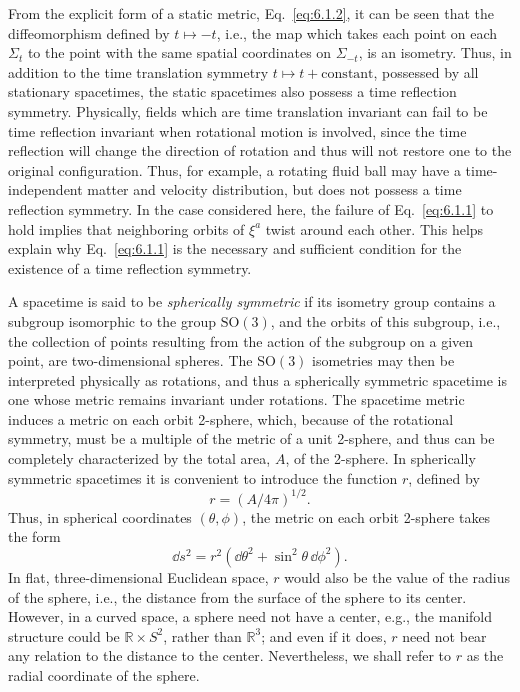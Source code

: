 From the explicit form of a static metric, Eq.~\eqref{eq:6.1.2}, it can be seen
that the diffeomorphism defined by \(t\mapsto-t\), i.e., the map which takes each
point on each \(\Sigma_t\) to the point with the same spatial coordinates on
\(\Sigma_{-t}\), is an isometry. Thus, in addition to the time translation
symmetry \(t\mapsto t+\text{constant}\), possessed by all stationary spacetimes,
the static spacetimes also possess a time reflection symmetry. Physically, fields
which are time translation invariant can fail to be time reflection invariant when
rotational motion is involved, since the time reflection will change the direction
of rotation and thus will not restore one to the original configuration. Thus, for
example, a rotating fluid ball may have a time-independent matter and velocity
distribution, but does not possess a time reflection symmetry. In the case
considered here, the failure of Eq.~\eqref{eq:6.1.1} to hold implies that
neighboring orbits of \(\xi^a\) twist around each other. This helps explain why
Eq.~\eqref{eq:6.1.1} is the necessary and sufficient condition for the existence of
a time reflection symmetry.

A spacetime is said to be \emph{spherically symmetric} if its isometry group
contains a subgroup isomorphic to the group \(\mathrm{SO}(3)\), and the orbits of
this subgroup, i.e., the collection of points resulting from the action of the
subgroup on a given point, are two-dimensional spheres. The \(\mathrm{SO}(3)\)
isometries may then be interpreted physically as rotations, and thus a
spherically symmetric spacetime is one whose metric remains invariant under
rotations. The spacetime metric induces a metric on each orbit 2-sphere, which,
because of the rotational symmetry, must be a multiple of the metric of a unit
2-sphere, and thus can be completely characterized by the total area, \(A\), of
the 2-sphere. In spherically symmetric spacetimes it is convenient to introduce
the function \(r\), defined by
\begin{equation}
  r=(A/4\pi)^{1/2}.
  \tag{6.1.3}\label{eq:6.1.3}
\end{equation}
Thus, in spherical coordinates \((\theta,\phi)\), the metric on each orbit
2-sphere takes the form
\begin{equation}
  \dd s^2=r^2(\dd\theta^2+\sin^2\theta\,\dd\phi^2).
  \tag{6.1.4}\label{eq:6.1.4}
\end{equation}
In flat, three-dimensional Euclidean space, \(r\) would also be the value of the
radius of the sphere, i.e., the distance from the surface of the sphere to its
center. However, in a curved space, a sphere need not have a center, e.g., the
manifold structure could be \(\mathbb R\times S^2\), rather than \(\mathbb R^3\);
and even if it does, \(r\) need not bear any relation to the distance to the
center. Nevertheless, we shall refer to \(r\) as the radial coordinate of the
sphere.

